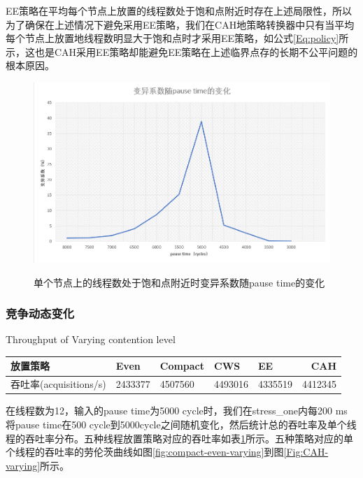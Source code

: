 EE策略在平均每个节点上放置的线程数处于饱和点附近时存在上述局限性，所以为了确保在上述情况下避免采用EE策略，我们在CAH地策略转换器中只有当平均每个节点上放置地线程数明显大于饱和点时才采用EE策略，如公式\ref{Eq:policy}所示，这也是CAH采用EE策略却能避免EE策略在上述临界点存的长期不公平问题的根本原因。

\begin{figure}[t]
	\centering
	\includegraphics[width=5.6in]{figure/CV-pause.PNG}
	\caption{单个节点上的线程数处于饱和点附近时变异系数随pause time的变化}{}
	\label{Fig:CV-pause}
\end{figure}

\subsubsection{竞争动态变化}
\begin{table}[!hpb]
  \centering
    {Throughput of Varying contention level}
  \label{tab:thrpt-varying}
  \begin{tabular}{@{}lllllr@{}} \toprule
    放置策略 & Even & Compact & CWS & EE & CAH\\ \midrule
    吞吐率(acquisitions/s)	&2433377	&4507560	& 4493016	& 4335519	& 4412345 \\
  \end{tabular}
\end{table}
在线程数为12，输入的pause time为5000 cycle时，我们在stress\_one内每200 ms 将pause time在500 cycle到5000cycle之间随机变化，然后统计总的吞吐率及单个线程的吞吐率分布。五种线程放置策略对应的吞吐率如表\ref{tab:thrpt-varying}所示。五种策略对应的单个线程的吞吐率的劳伦茨曲线如图\ref{fig:compact-even-varying}到图\ref{Fig:CAH-varying}所示。

